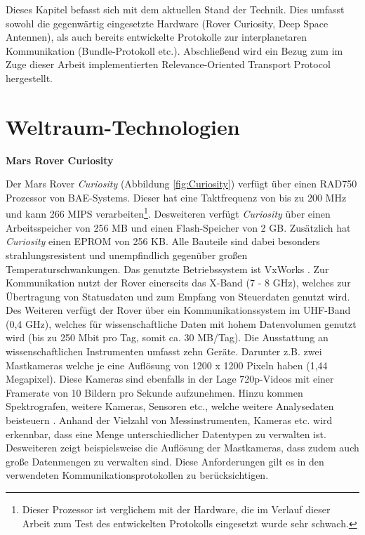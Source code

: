 \label{cap:standDerTechnik}
Dieses Kapitel befasst sich mit dem aktuellen Stand der Technik. Dies
umfasst sowohl die gegenw{\"a}rtig eingesetzte Hardware (Rover Curiosity, Deep
Space Antennen), als auch bereits entwickelte Protokolle zur interplanetaren
Kommunikation (Bundle-Protokoll etc.). Abschlie{\ss}end wird ein Bezug zum im
Zuge dieser Arbeit implementierten Relevance-Oriented Transport Protocol
hergestellt.

\section{Weltraum-Technologien}

\textbf{Mars Rover Curiosity} \newline

Der Mars Rover \textit{Curiosity} (Abbildung \ref{fig:Curiosity}) verf{\"u}gt
{\"u}ber einen RAD750 Prozessor von BAE-Systems.
Dieser hat eine Taktfrequenz von bis zu 200 MHz und kann 266 MIPS
verarbeiten\footnote{Dieser Prozessor ist verglichem mit der Hardware, die im
Verlauf dieser Arbeit zum Test des entwickelten Protokolls eingesetzt wurde
sehr schwach.}. Desweiteren verf{\"u}gt \textit{Curiosity} {\"u}ber einen
Arbeitsspeicher von 256 MB und einen Flash-Speicher von 2 GB. Zus{\"a}tzlich
hat \textit{Curiosity} einen EPROM von 256 KB. Alle Bauteile sind dabei
besonders strahlungsresistent und unempfindlich gegen{\"u}ber gro{\ss}en
Temperaturschwankungen. Das genutzte Betriebssystem ist VxWorks \cite{WR}.
Zur Kommunikation nutzt der Rover einerseits das X-Band (7 - 8 GHz), welches zur
{\"U}bertragung von Statusdaten und zum Empfang von Steuerdaten genutzt wird.
Des Weiteren verf{\"u}gt der Rover {\"u}ber ein Kommunikationssystem im UHF-Band
(0,4 GHz), welches f{\"u}r wissenschaftliche Daten mit hohem Datenvolumen
genutzt wird (bis zu 250 Mbit pro Tag, somit ca. 30 MB/Tag). Die Ausstattung an
wissenschaftlichen Instrumenten umfasst zehn Ger{\"a}te. Darunter z.B. zwei
Mastkameras welche je eine Aufl{\"o}sung von 1200 x 1200 Pixeln haben (1,44
Megapixel). Diese Kameras sind ebenfalls in der Lage 720p-Videos mit einer
Framerate von 10 Bildern pro Sekunde aufzunehmen. Hinzu kommen Spektrografen,
weitere Kameras, Sensoren etc., welche weitere Analysedaten beisteuern
\cite{web5}. Anhand der Vielzahl von Messinstrumenten, Kameras etc. wird
erkennbar, dass eine Menge unterschiedlicher Datentypen zu verwalten ist.
Desweiteren zeigt beispielsweise die Aufl{\"o}sung der Mastkameras, dass zudem
auch gro{\ss}e Datenmengen zu verwalten sind. Diese Anforderungen gilt es in den
verwendeten Kommunikationsprotokollen zu ber{\"u}cksichtigen.

